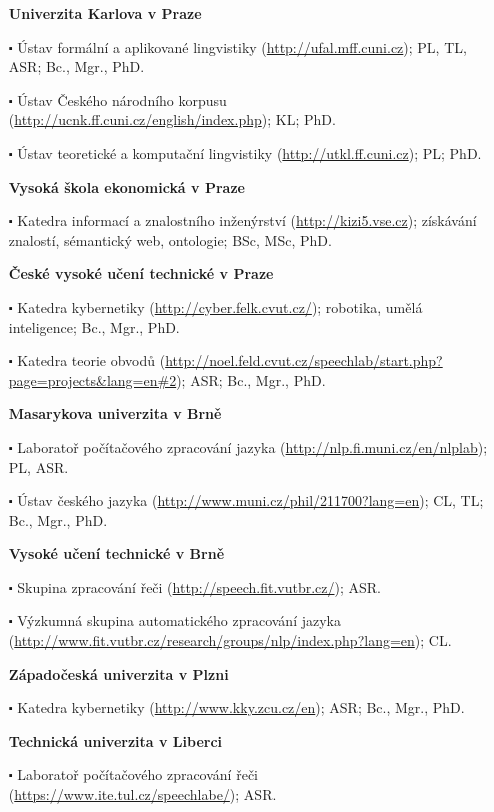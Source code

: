 \begin{multicols}{2}
\begin{itemize}
\item[]$\!\!\!\!\!\!$\textbf{Univerzita Karlova v Praze}
 \item[$\centerdot$]Ústav formální a aplikované lingvistiky
  (\url{http://ufal.mff.cuni.cz});  PL, TL, ASR; Bc., Mgr., PhD.
 \item[$\centerdot$]Ústav Českého národního korpusu
   (\url{http://ucnk.ff.cuni.cz/english/index.php});
  KL; PhD.
 \item[$\centerdot$]Ústav teoretické a komputační lingvistiky
  (\url{http://utkl.ff.cuni.cz}); PL; PhD.
\item[]$\!\!\!\!\!\!$\textbf{Vysoká škola ekonomická v Praze}
 \item[$\centerdot$]Katedra informací a znalostního inženýrství
  (\url{http://kizi5.vse.cz});
  získávání znalostí, sémantický web, ontologie; BSc, MSc, PhD.
\item[]$\!\!\!\!\!\!$\textbf{České vysoké učení technické v Praze}
 \item[$\centerdot$]Katedra kybernetiky
  (\url{http://cyber.felk.cvut.cz/});
  robotika, umělá inteligence; Bc., Mgr., PhD.
 \item[$\centerdot$]Katedra teorie obvodů
  (\url{http://noel.feld.cvut.cz/speechlab/start.php?page=projects&lang=en#2});
  ASR; Bc., Mgr., PhD.
\item[]$\!\!\!\!\!\!$\textbf{Masarykova univerzita v Brně}
 \item[$\centerdot$]Laboratoř počítačového zpracování jazyka
  (\url{http://nlp.fi.muni.cz/en/nlplab}); PL, ASR. 
 \item[$\centerdot$]Ústav českého jazyka
  (\url{http://www.muni.cz/phil/211700?lang=en});
  CL, TL; Bc., Mgr., PhD.
\item[]$\!\!\!\!\!\!$\textbf{Vysoké učení technické v Brně}
 \item[$\centerdot$]Skupina zpracování řeči
  (\url{http://speech.fit.vutbr.cz/}); ASR. 
 \item[$\centerdot$]Výzkumná skupina automatického zpracování jazyka
  (\url{http://www.fit.vutbr.cz/research/groups/nlp/index.php?lang=en}); CL. 
\columnbreak
\item[]$\!\!\!\!\!\!$\textbf{Západočeská univerzita v Plzni}
 \item[$\centerdot$]Katedra kybernetiky
  (\url{http://www.kky.zcu.cz/en});
  ASR; Bc., Mgr., PhD.
\item[]$\!\!\!\!\!\!$\textbf{Technická univerzita v Liberci}
 \item[$\centerdot$]Laboratoř počítačového zpracování řeči
  (\url{https://www.ite.tul.cz/speechlabe/}); ASR. 
\end{itemize}


\end{multicols}
